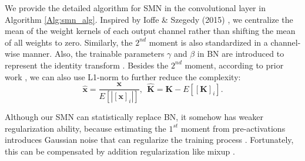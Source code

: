 \documentclass[10pt,journal,compsoc]{IEEEtran}
\begin{document}
\vspace{-10pt} 
We provide the detailed algorithm for SMN in the convolutional layer in Algorithm \ref{Alg:smn_alg}. Inspired by Ioffe \& Szegedy (2015) \cite{ioffe2015batch}, we centralize the mean of the weight kernels of each output channel rather than shifting the mean of all weights to zero. Similarly, the $2^{nd}$ moment is also standardized in a channel-wise manner. Also, the trainable parameters $\gamma$ and $\beta$ in BN are introduced to represent the identity transform \cite{ioffe2015batch}. Besides the $2^{nd}$ moment, according to prior work \cite{wu2018l1}, we can also use L1-norm to further reduce the complexity:
\begin{equation}
    \hat{\mathbf{x}} = \frac{\mathbf{x}}{E\left[|[\mathbf{x}]_i|\right]},~~\hat{\mathbf{K}} = \mathbf{K} - E[[\mathbf{K}]_i].
\end{equation}

Although our SMN can statistically replace BN, it somehow has weaker regularization ability, because estimating the $1^{st}$ moment from pre-activations introduces Gaussian noise that can regularize the training process \cite{luo2018towards}. Fortunately, this can be compensated by addition regularization like mixup \cite{zhang2017mixup}.
\end{document}
